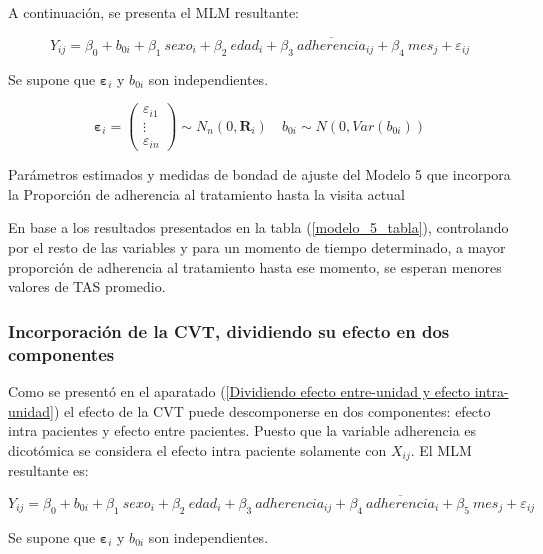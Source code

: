 \documentclass[spanish]{article}
\numberwithin{figure}{subsection}
\numberwithin{equation}{subsection}
\numberwithin{table}{subsection}
\begin{document}
A continuación, se presenta el MLM resultante:

\begin{equation}
	\label{modelo_5}
	Y_{ij} = \beta_0 + b_{0i} + \beta_1\ sexo_i + \beta_2\ edad_i + \beta_3\ \overline{adherencia}_{ij}
	+ \beta_4\ mes_j + \varepsilon_{ij}
\end{equation}

Se supone que $\bm{\varepsilon}_i$ y $b_{0i}$ son independientes.

\[ 
	\bm{\varepsilon}_i = \begin{pmatrix} \varepsilon_{i1} \\ \vdots \\ \varepsilon_{in} \end{pmatrix} \sim N_{n}(0, \bm{R}_i)
	\quad
	b_{0i} \sim N(0, Var(b_{0i}))
\]

\begin{table}[H]
	\centering
	\caption{Parámetros estimados y medidas de bondad de ajuste del Modelo 5 que incorpora la Proporción de adherencia al tratamiento hasta la visita actual}
	\label{modelo_5_tabla}
	
\end{table}

En base a los resultados presentados en la tabla (\ref{modelo_5_tabla}),
controlando por el resto de las variables y para un momento de tiempo
determinado, a mayor proporción de adherencia al tratamiento hasta ese momento,
se esperan menores valores de TAS promedio.

\subsubsection{Incorporación de la CVT, dividiendo su efecto en dos componentes}

Como se presentó en el aparatado (\ref{Dividiendo efecto entre-unidad y efecto
intra-unidad}) el efecto de la CVT puede descomponerse en dos componentes:
efecto intra pacientes y efecto entre pacientes. Puesto que la variable
adherencia es dicotómica se considera el efecto intra paciente solamente con
$X_{ij}$. El MLM resultante es:

\begin{equation}
	\label{modelo_6}
	Y_{ij} = \beta_0 + b_{0i} + \beta_1\ sexo_i + \beta_2\ edad_i + \beta_3\ adherencia_{ij}
	+ \beta_4\ \overline{adherencia}_i + \beta_5\ mes_j + \varepsilon_{ij}
\end{equation}

Se supone que $\bm{\varepsilon}_i$ y $b_{0i}$ son independientes.
\end{document}
